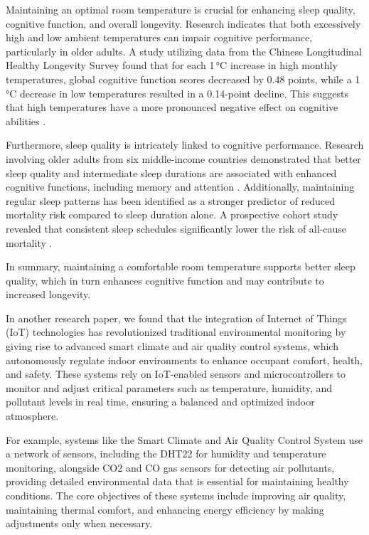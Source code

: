 \documentclass[a4paper]{scrartcl}
\begin{document}
Maintaining an optimal room temperature is crucial for enhancing sleep quality, cognitive function, and overall longevity. Research indicates that both excessively high and low ambient temperatures can impair cognitive performance, particularly in older adults. A study utilizing data from the Chinese Longitudinal Healthy Longevity Survey found that for each 1\,°C increase in high monthly temperatures, global cognitive function scores decreased by 0.48 points, while a 1\,°C decrease in low temperatures resulted in a 0.14-point decline. This suggests that high temperatures have a more pronounced negative effect on cognitive abilities \cite{r21}. 

Furthermore, sleep quality is intricately linked to cognitive performance. Research involving older adults from six middle-income countries demonstrated that better sleep quality and intermediate sleep durations are associated with enhanced cognitive functions, including memory and attention \cite{r24}. Additionally, maintaining regular sleep patterns has been identified as a stronger predictor of reduced mortality risk compared to sleep duration alone. A prospective cohort study revealed that consistent sleep schedules significantly lower the risk of all-cause mortality \cite{r22}.

In summary, maintaining a comfortable room temperature supports better sleep quality, which in turn enhances cognitive function and may contribute to increased longevity.

In another research paper, we found that the integration of Internet of Things (IoT) technologies has revolutionized traditional environmental monitoring by giving rise to advanced smart climate and air quality control systems, which autonomously regulate indoor environments to enhance occupant comfort, health, and safety. These systems rely on IoT-enabled sensors and microcontrollers to monitor and adjust critical parameters such as temperature, humidity, and pollutant levels in real time, ensuring a balanced and optimized indoor atmosphere\cite{r23}.

For example, systems like the Smart Climate and Air Quality Control System use a network of sensors, including the DHT22 for humidity and temperature monitoring, alongside CO2 and CO gas sensors for detecting air pollutants, providing detailed environmental data that is essential for maintaining healthy conditions. The core objectives of these systems include improving air quality, maintaining thermal comfort, and enhancing energy efficiency by making adjustments only when necessary.
\end{document}
